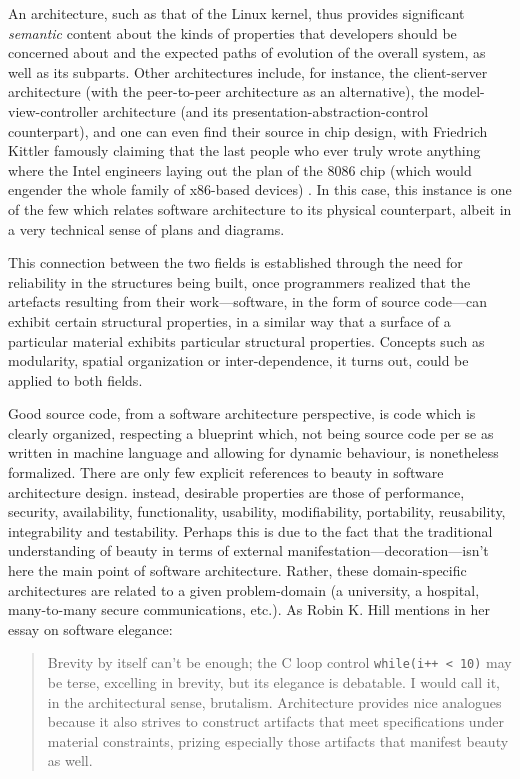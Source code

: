 An architecture, such as that of the Linux kernel, thus provides significant \emph{semantic} content about the kinds of properties that developers should be concerned about and the expected paths of evolution of the overall system, as well as its subparts. Other architectures include, for instance, the client-server architecture (with the peer-to-peer architecture as an alternative), the model-view-controller architecture (and its presentation-abstraction-control counterpart), and one can even find their source in chip design, with Friedrich Kittler famously claiming that the last people who ever truly wrote anything where the Intel engineers laying out the plan of the 8086 chip (which would engender the whole family of x86-based devices) \citep{kittler_there_1997}. In this case, this instance is one of the few which relates software architecture to its physical counterpart, albeit in a very technical sense of plans and diagrams.

This connection between the two fields is established through the need for reliability in the structures being built, once programmers realized that the artefacts resulting from their work—software, in the form of source code—can exhibit certain structural properties, in a similar way that a surface of a particular material exhibits particular structural properties. Concepts such as modularity, spatial organization or inter-dependence, it turns out, could be applied to both fields.

Good source code, from a software architecture perspective, is code which is clearly organized, respecting a blueprint which, not being source code per se as written in machine language and allowing for dynamic behaviour, is nonetheless formalized. There are only few explicit references to beauty in software architecture design. instead, desirable properties are those of performance, security, availability, functionality, usability, modifiability, portability, reusability, integrability and testability. Perhaps this is due to the fact that the traditional understanding of beauty in terms of external manifestation—decoration—isn't here the main point of software architecture. Rather, these domain-specific architectures are related to a given problem-domain (a university, a hospital, many-to-many secure communications, etc.). As Robin K. Hill mentions in her essay on software elegance:

\begin{quote}
  Brevity by itself can't be enough; the C loop control \lstinline{while(i++ < 10)} may be terse, excelling in brevity, but its elegance is debatable. I would call it, in the architectural sense, brutalism. Architecture provides nice analogues because it also strives to construct artifacts that meet specifications under material constraints, prizing especially those artifacts that manifest beauty as well. \citep{hill_what_2016}
\end{quote}

